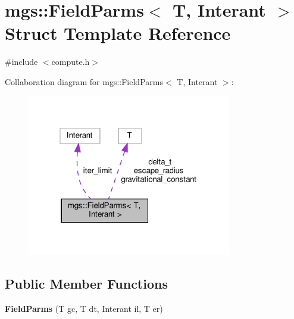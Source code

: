 \hypertarget{structmgs_1_1FieldParms}{}\section{mgs\+:\+:Field\+Parms$<$ T, Interant $>$ Struct Template Reference}
\label{structmgs_1_1FieldParms}


{\ttfamily \#include $<$compute.\+h$>$}



Collaboration diagram for mgs\+:\+:Field\+Parms$<$ T, Interant $>$\+:
\nopagebreak
\begin{figure}[H]
\begin{center}
\leavevmode
\includegraphics[width=253pt]{structmgs_1_1FieldParms__coll__graph}
\end{center}
\end{figure}
\subsection*{Public Member Functions}
\begin{DoxyCompactItemize}
\item 
\mbox{\label{structmgs_1_1FieldParms_adaf0666fe2bbad51d39d46db25a42495}} 
{\bfseries Field\+Parms} (T gc, T dt, Interant il, T er)
\end{DoxyCompactItemize}
